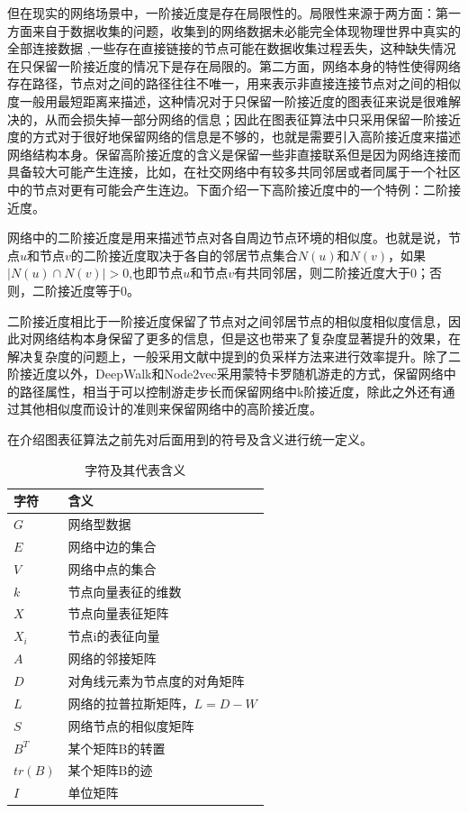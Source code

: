 但在现实的网络场景中，一阶接近度是存在局限性的。局限性来源于两方面：第一方面来自于数据收集的问题，收集到的网络数据未必能完全体现物理世界中真实的全部连接数据\cite{liben2007link} ,一些存在直接链接的节点可能在数据收集过程丢失，这种缺失情况在只保留一阶接近度的情况下是存在局限的。第二方面，网络本身的特性使得网络存在路径，节点对之间的路径往往不唯一，用来表示非直接连接节点对之间的相似度一般用最短距离来描述，这种情况对于只保留一阶接近度的图表征来说是很难解决的，从而会损失掉一部分网络的信息；因此在图表征算法中只采用保留一阶接近度的方式对于很好地保留网络的信息是不够的，也就是需要引入高阶接近度来描述网络结构本身。保留高阶接近度的含义是保留一些非直接联系但是因为网络连接而具备较大可能产生连接，比如，在社交网络中有较多共同邻居或者同属于一个社区中的节点对更有可能会产生连边。下面介绍一下高阶接近度中的一个特例：二阶接近度。

网络中的二阶接近度是用来描述节点对各自周边节点环境的相似度。也就是说，节点$u$和节点$v$的二阶接近度取决于各自的邻居节点集合$N(u)$和$N(v)$，如果$|N(u) \cap N(v)|>0$,也即节点$u$和节点$v$有共同邻居，则二阶接近度大于0；否则，二阶接近度等于0。

二阶接近度相比于一阶接近度保留了节点对之间邻居节点的相似度相似度信息，因此对网络结构本身保留了更多的信息，但是这也带来了复杂度显著提升的效果，在解决复杂度的问题上，一般采用文献\cite{mikolov2013distributed}中提到的负采样方法来进行效率提升。除了二阶接近度以外，DeepWalk和Node2vec采用蒙特卡罗随机游走的方式，保留网络中的路径属性，相当于可以控制游走步长而保留网络中k阶接近度，除此之外还有通过其他相似度而设计的准则来保留网络中的高阶接近度\cite{ou2016asymmetric}。

在介绍图表征算法之前先对后面用到的符号及含义进行统一定义。
\begin{table}
	\centering
	\caption{字符及其代表含义}
	\begin{tabular}{|C{1.8in}|C{3.3in}|}
		\hline
		\textbf{字符} & \textbf{含义} \\ \hline\hline
		$G$ & 网络型数据 \\ \hline
		$E$ & 网络中边的集合 \\ \hline
		$V$& 网络中点的集合 \\ \hline
		$k$ & 节点向量表征的维数  \\ \hline
		$X$ & 节点向量表征矩阵 \\ \hline
		$X_i$ & 节点i的表征向量 \\ \hline
		$A$ & 网络的邻接矩阵 \\ \hline
		$D$ & 对角线元素为节点度的对角矩阵\\ \hline
		$L$ & 网络的拉普拉斯矩阵，$L=D-W$ \\ \hline
		$S$ & 网络节点的相似度矩阵 \\ \hline
		$B^T$ & 某个矩阵B的转置 \\ \hline
		$tr(B)$ & 某个矩阵B的迹 \\ \hline
		$I$ & 单位矩阵 \\ \hline
	\end{tabular}
\end{table}

